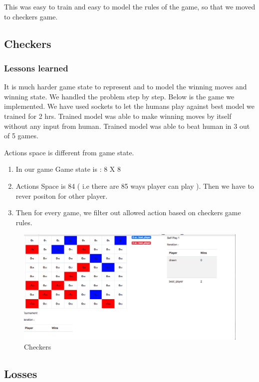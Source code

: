 \documentclass{article}
\begin{document}
This was easy to train and easy to model the rules of the game, so that we moved to checkers game.

\subsection{Checkers}
\subsubsection{Lessons learned}
It is much harder game state to represent and to model the winning moves and winning state. We handled the problem step by step. Below is the game we implemented. We have used sockets to let the humans play against best model we trained for 2 hrs. Trained model was able to make winning moves by itself without any input from human. Trained model was able to beat human in 3 out of 5 games.

Actions space is different from game state.
    \begin{enumerate}
        \item In our game Game state is : 8 X 8
        \item Actions Space is 84 ( i.e there are 85 ways player can play ). Then we have to rever positon for other     player.
        \item Then for every game, we filter out allowed action based on checkers game rules.
    \end{enumerate}

\begin{figure}[H]
    \centering
    \includegraphics[width=\textwidth,scale=0.1,]{checkers.png}
    \caption{Checkers}
    \label{fig:my_label}
\end{figure}


\subsection{Losses}
\end{document}
